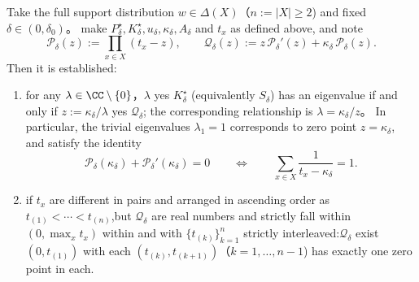 \begin{theorem}\label{thm:pom-maxent-markov-laguerre-secular-spectrum}
Take the full support distribution \(w\in\Delta(X)\)（\(n:=|X|\ge 2\)) and fixed \(\delta\in(0,\delta_0)\)。
make \(P^\star_\delta,K^\star_\delta,u_\delta,\kappa_\delta,A_\delta\) and \(t_x\) as defined above, and note
\[
\mathcal P_\delta(z):=\prod_{x\in X}(t_x-z),\qquad
\mathcal Q_\delta(z):=z\,\mathcal P_\delta'(z)+\kappa_\delta\,\mathcal P_\delta(z).
\]
Then it is established:
\begin{enumerate}
  \item for any \(\lambda\in\CC\setminus\{0\}\)，\(\lambda\) yes \(K^\star_\delta\) (equivalently \(S_\delta\)) has an eigenvalue if and only if
  \(
  z:=\kappa_\delta/\lambda
  \)
  yes \(\mathcal Q_\delta\); the corresponding relationship is \(\lambda=\kappa_\delta/z\)。
  In particular, the trivial eigenvalues \(\lambda_1=1\) corresponds to zero point \(z=\kappa_\delta\), and satisfy the identity
  \[
  \mathcal P_\delta(\kappa_\delta)+\mathcal P_\delta'(\kappa_\delta)=0
  \qquad\Longleftrightarrow\qquad
  \sum_{x\in X}\frac{1}{t_x-\kappa_\delta}=1.
  \]
  \item if \(t_x\) are different in pairs and arranged in ascending order as \(t_{(1)}<\cdots<t_{(n)}\),but \(\mathcal Q_\delta\) are real numbers and strictly fall within \((0,\max_x t_x)\) within and with \(\{t_{(k)}\}_{k=1}^{n}\) strictly interleaved:\(\mathcal Q_\delta\) exist \((0,t_{(1)})\) with each \((t_{(k)},t_{(k+1)})\)（\(k=1,\dots,n-1\)) has exactly one zero point in each.
\end{enumerate}
\end{theorem}
